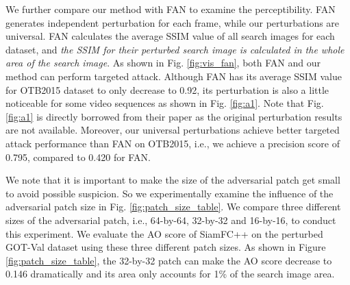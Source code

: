 \documentclass[journal]{IEEEtran}
\newcommand{\ie}{i.e.}
\begin{document}
We further compare our method with FAN \cite{FAN} to examine the perceptibility. FAN generates independent perturbation for each frame, while our perturbations are universal. FAN calculates the average SSIM value of all search images for each dataset, and \textit{the SSIM for their perturbed search image is calculated in the whole area of the search image}.
As shown in Fig. \ref{fig:vis_fan}, both FAN and our method can perform targeted attack. Although FAN has its average SSIM value for OTB2015 dataset to only decrease to 0.92, its perturbation is also a little noticeable for some video sequences as shown in Fig. \ref{fig:a1}. Note that Fig. \ref{fig:a1} is directly borrowed from their paper as the original perturbation results are not available. Moreover, our universal perturbations achieve better targeted attack performance than FAN on OTB2015, \ie, we achieve a precision score of 0.795, compared to 0.420 for FAN.

We note that it is important to make the size of the adversarial patch get small to avoid possible suspicion. So we experimentally examine the influence of the adversarial patch size in Fig. \ref{fig:patch_size_table}. We compare three different sizes of the adversarial patch, \ie, 64-by-64, 32-by-32 and 16-by-16, to conduct this experiment. We evaluate the AO score of SiamFC++ on the perturbed GOT-Val dataset using these three different patch sizes.
As shown in Figure \ref{fig:patch_size_table}, the 32-by-32 patch can make the AO score decrease to 0.146 dramatically and its area only accounts for 1\% of the search image area.
\end{document}
